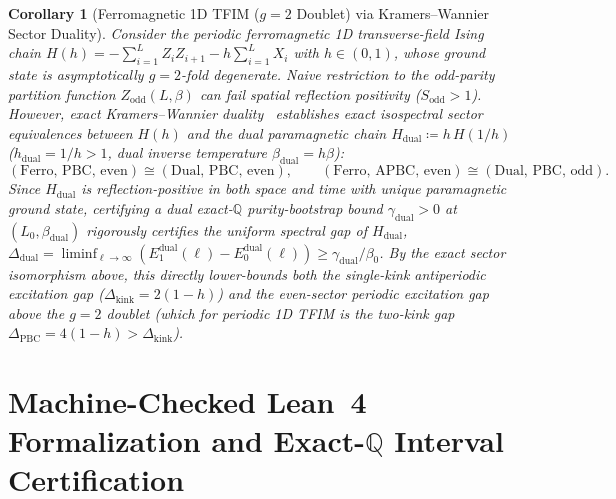 \documentclass[11pt,a4paper]{article}
\newtheorem{corollary}[theorem]{Corollary}
\theoremstyle{definition}
\newcommand{\Q}{\mathbb{Q}}
\begin{document}
\begin{corollary}[Ferromagnetic 1D TFIM ($g=2$ Doublet) via Kramers--Wannier Sector Duality]
\label{cor:z2_ferro}
Consider the periodic ferromagnetic 1D transverse-field Ising chain $H(h) = -\sum_{i=1}^L Z_i Z_{i+1} - h \sum_{i=1}^L X_i$ with $h \in (0,1)$, whose ground state is asymptotically $g=2$-fold degenerate. Naive restriction to the odd-parity partition function $Z_{\mathrm{odd}}(L,\beta)$ can fail spatial reflection positivity ($S_{\mathrm{odd}} > 1$). However, exact Kramers--Wannier duality~\cite{Kramers1941Statistics,Grover2026Extensions} establishes exact isospectral sector equivalences between $H(h)$ and the dual paramagnetic chain $H_{\mathrm{dual}} \coloneqq h\, H(1/h)$ ($h_{\mathrm{dual}} = 1/h > 1$, dual inverse temperature $\beta_{\mathrm{dual}} = h\beta$):
\[
  (\text{Ferro, PBC, even}) \cong (\text{Dual, PBC, even}), \qquad
  (\text{Ferro, APBC, even}) \cong (\text{Dual, PBC, odd}).
\]
Since $H_{\mathrm{dual}}$ is reflection-positive in both space and time with unique paramagnetic ground state, certifying a dual exact-$\Q$ purity-bootstrap bound $\gamma_{\mathrm{dual}} > 0$ at $(L_0, \beta_{\mathrm{dual}})$ rigorously certifies the uniform spectral gap of $H_{\mathrm{dual}}$, $\Delta_{\mathrm{dual}} = \liminf_{\ell\to\infty}(E_1^{\mathrm{dual}}(\ell) - E_0^{\mathrm{dual}}(\ell)) \ge \gamma_{\mathrm{dual}} / \beta_0$. By the exact sector isomorphism above, this directly lower-bounds both the single-kink antiperiodic excitation gap ($\Delta_{\mathrm{kink}} = 2(1-h)$) and the even-sector periodic excitation gap above the $g=2$ doublet (which for periodic 1D TFIM is the two-kink gap $\Delta_{\mathrm{PBC}} = 4(1-h) > \Delta_{\mathrm{kink}}$).
\end{corollary}

\section{Machine-Checked Lean~4 Formalization and Exact-\texorpdfstring{$\Q$}{Q} Interval Certification}
\label{sec:formalization}
\end{document}
